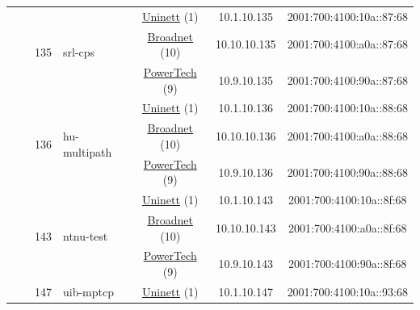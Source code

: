 \begin{small}
\begin{center}
\begin{longtable}{|c|c|c|c|c|c|c|c|}
  &  & \multirow{3}{*}{\tiny{135}} & \multicolumn{1}{|l|}{\multirow{3}{*}{\tiny{srl-cps}}} & \multicolumn{2}{|c|}{\tiny{\href{https://www.uninett.no}{Uninett} (1)}} & \tiny{10.1.10.135} & \tiny{2001:700:4100:10a::87:68} \\* \cline{5-5}\cline{6-6}\cline{7-7}\cline{8-8}
  &  &  &  & \multicolumn{2}{|c|}{\tiny{\href{https://www.broadnet.no}{Broadnet} (10)}} & \tiny{10.10.10.135} & \tiny{2001:700:4100:a0a::87:68} \\* \cline{5-5}\cline{6-6}\cline{7-7}\cline{8-8}
  &  &  &  & \multicolumn{2}{|c|}{\tiny{\href{http://www.powertech.no}{PowerTech} (9)}} & \tiny{10.9.10.135} & \tiny{2001:700:4100:90a::87:68} \\* \cline{3-3}\cline{4-4}\cline{5-5}\cline{6-6}\cline{7-7}\cline{8-8}
  &  & \multirow{3}{*}{\tiny{136}} & \multicolumn{1}{|l|}{\multirow{3}{*}{\tiny{hu-multipath}}} & \multicolumn{2}{|c|}{\tiny{\href{https://www.uninett.no}{Uninett} (1)}} & \tiny{10.1.10.136} & \tiny{2001:700:4100:10a::88:68} \\* \cline{5-5}\cline{6-6}\cline{7-7}\cline{8-8}
  &  &  &  & \multicolumn{2}{|c|}{\tiny{\href{https://www.broadnet.no}{Broadnet} (10)}} & \tiny{10.10.10.136} & \tiny{2001:700:4100:a0a::88:68} \\* \cline{5-5}\cline{6-6}\cline{7-7}\cline{8-8}
  &  &  &  & \multicolumn{2}{|c|}{\tiny{\href{http://www.powertech.no}{PowerTech} (9)}} & \tiny{10.9.10.136} & \tiny{2001:700:4100:90a::88:68} \\* \cline{3-3}\cline{4-4}\cline{5-5}\cline{6-6}\cline{7-7}\cline{8-8}
  &  & \multirow{3}{*}{\tiny{143}} & \multicolumn{1}{|l|}{\multirow{3}{*}{\tiny{ntnu-test}}} & \multicolumn{2}{|c|}{\tiny{\href{https://www.uninett.no}{Uninett} (1)}} & \tiny{10.1.10.143} & \tiny{2001:700:4100:10a::8f:68} \\* \cline{5-5}\cline{6-6}\cline{7-7}\cline{8-8}
  &  &  &  & \multicolumn{2}{|c|}{\tiny{\href{https://www.broadnet.no}{Broadnet} (10)}} & \tiny{10.10.10.143} & \tiny{2001:700:4100:a0a::8f:68} \\* \cline{5-5}\cline{6-6}\cline{7-7}\cline{8-8}
  &  &  &  & \multicolumn{2}{|c|}{\tiny{\href{http://www.powertech.no}{PowerTech} (9)}} & \tiny{10.9.10.143} & \tiny{2001:700:4100:90a::8f:68} \\* \cline{3-3}\cline{4-4}\cline{5-5}\cline{6-6}\cline{7-7}\cline{8-8}
  &  & \multirow{3}{*}{\tiny{147}} & \multicolumn{1}{|l|}{\multirow{3}{*}{\tiny{uib-mptcp}}} & \multicolumn{2}{|c|}{\tiny{\href{https://www.uninett.no}{Uninett} (1)}} & \tiny{10.1.10.147} & \tiny{2001:700:4100:10a::93:68} \\* \cline{5-5}\cline{6-6}\cline{7-7}\cline{8-8}

\end{longtable}
\end{center}
\end{small}
